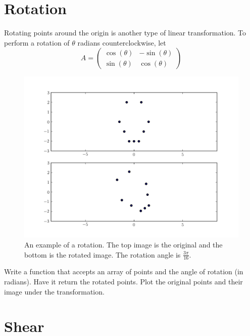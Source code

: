 \section*{Rotation}
Rotating points around the origin is another type of linear transformation.
To perform a rotation of $\theta$ radians counterclockwise, let
\[
A = \begin{pmatrix}
\cos(\theta) & -\sin(\theta) \\
\sin(\theta) & \cos(\theta)
\end{pmatrix}
\]

\begin{figure}
\centering
\includegraphics[width=\textwidth]{rotate.pdf}
\caption{An example of a rotation.
The top image is the original and the bottom is the rotated image.
The rotation angle is $\frac{3\pi}{16}$.}
\label{basis:rotate}
\end{figure}

\begin{problem}
Write a function that accepts an array of points and the angle of rotation (in
radians). Have it return the rotated points.
Plot the original points and their image under the transformation.
\end{problem}

\section*{Shear}

